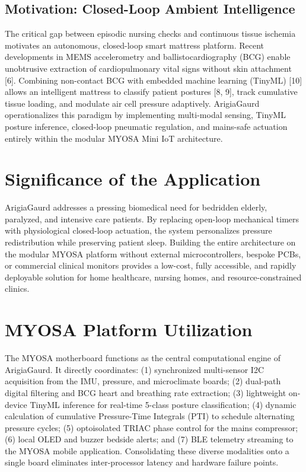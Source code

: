 ﻿\documentclass[11pt,a4paper]{article}
\begin{document}
\subsection{Motivation: Closed-Loop Ambient Intelligence}
The critical gap between episodic nursing checks and continuous tissue ischemia motivates an autonomous, closed-loop smart mattress platform. Recent developments in MEMS accelerometry and ballistocardiography (BCG) enable unobtrusive extraction of cardiopulmonary vital signs without skin attachment [6]. Combining non-contact BCG with embedded machine learning (TinyML) [10] allows an intelligent mattress to classify patient postures [8, 9], track cumulative tissue loading, and modulate air cell pressure adaptively. ArigiaGaurd operationalizes this paradigm by implementing multi-modal sensing, TinyML posture inference, closed-loop pneumatic regulation, and mains-safe actuation entirely within the modular MYOSA Mini IoT architecture.

\section{Significance of the Application}
ArigiaGaurd addresses a pressing biomedical need for bedridden elderly, paralyzed, and intensive care patients. By replacing open-loop mechanical timers with physiological closed-loop actuation, the system personalizes pressure redistribution while preserving patient sleep. Building the entire architecture on the modular MYOSA platform without external microcontrollers, bespoke PCBs, or commercial clinical monitors provides a low-cost, fully accessible, and rapidly deployable solution for home healthcare, nursing homes, and resource-constrained clinics.

\section{MYOSA Platform Utilization}
The MYOSA motherboard functions as the central computational engine of ArigiaGaurd. It directly coordinates: (1) synchronized multi-sensor I2C acquisition from the IMU, pressure, and microclimate boards; (2) dual-path digital filtering and BCG heart and breathing rate extraction; (3) lightweight on-device TinyML inference for real-time 5-class posture classification; (4) dynamic calculation of cumulative Pressure-Time Integrals (PTI) to schedule alternating pressure cycles; (5) optoisolated TRIAC phase control for the mains compressor; (6) local OLED and buzzer bedside alerts; and (7) BLE telemetry streaming to the MYOSA mobile application. Consolidating these diverse modalities onto a single board eliminates inter-processor latency and hardware failure points.
\end{document}

